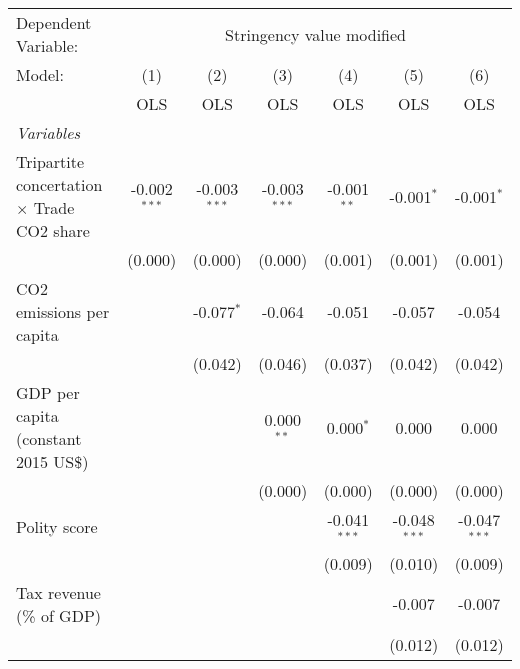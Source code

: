
\begingroup
\centering
\begin{tabular}{lcccccc}
   \toprule
   Dependent Variable: & \multicolumn{6}{c}{Stringency value modified}\\
   Model:                                            & (1)            & (2)            & (3)            & (4)            & (5)            & (6)\\  
                                                     &  OLS           & OLS            & OLS            & OLS            & OLS            & OLS\\  
   \midrule
   \emph{Variables}\\
   Tripartite concertation $\times$ Trade CO2 share  & -0.002$^{***}$ & -0.003$^{***}$ & -0.003$^{***}$ & -0.001$^{**}$  & -0.001$^{*}$   & -0.001$^{*}$\\   
                                                     & (0.000)        & (0.000)        & (0.000)        & (0.001)        & (0.001)        & (0.001)\\   
   CO2 emissions per capita                          &                & -0.077$^{*}$   & -0.064         & -0.051         & -0.057         & -0.054\\   
                                                     &                & (0.042)        & (0.046)        & (0.037)        & (0.042)        & (0.042)\\   
   GDP per capita (constant 2015 US\$)               &                &                & 0.000$^{**}$   & 0.000$^{*}$    & 0.000          & 0.000\\   
                                                     &                &                & (0.000)        & (0.000)        & (0.000)        & (0.000)\\   
   Polity score                                      &                &                &                & -0.041$^{***}$ & -0.048$^{***}$ & -0.047$^{***}$\\   
                                                     &                &                &                & (0.009)        & (0.010)        & (0.009)\\   
   Tax revenue (\% of GDP)                           &                &                &                &                & -0.007         & -0.007\\   
                                                     &                &                &                &                & (0.012)        & (0.012)\\   

\end{tabular}
